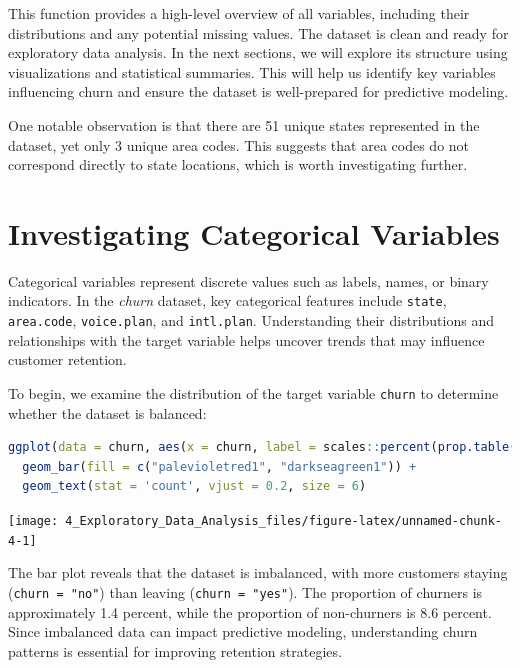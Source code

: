 \documentclass[
  11pt,
]{book}
\newcommand{\passthrough}[1]{#1}
\theoremstyle{definition}
\theoremstyle{definition}
\theoremstyle{definition}
\theoremstyle{definition}
\theoremstyle{remark}
\begin{document}
This function provides a high-level overview of all variables, including their distributions and any potential missing values. The dataset is clean and ready for exploratory data analysis. In the next sections, we will explore its structure using visualizations and statistical summaries. This will help us identify key variables influencing churn and ensure the dataset is well-prepared for predictive modeling.

One notable observation is that there are 51 unique states represented in the dataset, yet only 3 unique area codes. This suggests that area codes do not correspond directly to state locations, which is worth investigating further.

\section{Investigating Categorical Variables}\label{chapter-EDA-categorical}

Categorical variables represent discrete values such as labels, names, or binary indicators. In the \emph{churn} dataset, key categorical features include \passthrough{\lstinline!state!}, \passthrough{\lstinline!area.code!}, \passthrough{\lstinline!voice.plan!}, and \passthrough{\lstinline!intl.plan!}. Understanding their distributions and relationships with the target variable helps uncover trends that may influence customer retention.

To begin, we examine the distribution of the target variable \passthrough{\lstinline!churn!} to determine whether the dataset is balanced:

\begin{lstlisting}[language=R]
ggplot(data = churn, aes(x = churn, label = scales::percent(prop.table(stat(count))))) +
  geom_bar(fill = c("palevioletred1", "darkseagreen1")) + 
  geom_text(stat = 'count', vjust = 0.2, size = 6)
\end{lstlisting}

\begin{center}\texttt{[image: 4\_Exploratory\_Data\_Analysis\_files/figure-latex/unnamed-chunk-4-1]} \end{center}

The bar plot reveals that the dataset is imbalanced, with more customers staying (\passthrough{\lstinline!churn = "no"!}) than leaving (\passthrough{\lstinline!churn = "yes"!}). The proportion of churners is approximately 1.4 percent, while the proportion of non-churners is 8.6 percent. Since imbalanced data can impact predictive modeling, understanding churn patterns is essential for improving retention strategies.
\end{document}
